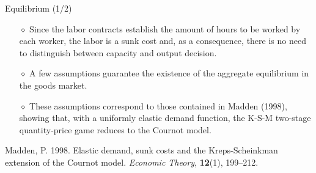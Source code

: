 \documentclass[9pt]{beamer}
\begin{document}
\begin{frame}{Equilibrium (1/2)}

\begin{itemize}

\item[$\diamond$] Since the labor contracts establish the amount of hours to be worked by each worker, the labor is a sunk cost and, as a
consequence, there is no need to distinguish between capacity and output
decision. 

\item[$\diamond$] A few assumptions guarantee the existence of the aggregate equilibrium in the goods market. 

\item[$\diamond$] These assumptions correspond to those contained in Madden (1998), showing that, with a uniformly elastic demand
function, the K-S-M two-stage quantity-price game reduces to the Cournot
model.

\end{itemize}

\bigskip
\bigskip
\small
Madden, P. 1998. Elastic demand, sunk costs and the Kreps-Scheinkman extension of the Cournot model. \emph{Economic Theory}, \textbf{12}(1), 199--212.

\end{frame}
\end{document}

